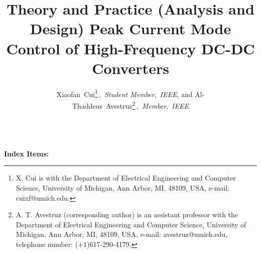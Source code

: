\documentclass[pdftex,letterpaper,11pt]{article}
\begin{document}
\theoremstyle{definition}
\newtheorem{theorem}{Theorem}

\theoremstyle{definition}
\newtheorem{definition}{Definition}

\theoremstyle{definition}
\newtheorem{corollary}{Corollary}

\title {\large  \bf \vspace{-10ex}
Theory and Practice (Analysis and Design) Peak Current Mode Control of High-Frequency DC-DC Converters
\vspace{0ex}}
\date{}
\author{Xiaofan~Cui\thanks{X. Cui is with the Department
of Electrical Engineering and Computer Science, University of Michigan, Ann Arbor,
MI, 48109, USA, e-mail: cuixf@umich.edu.}\,,\ \textit{Student Member},~\textit{IEEE},
        and Al-Thaddeus~Avestruz\thanks{A. T. Avestruz (corresponding author) is an assistant professor with the Department
        of Electrical Engineering and Computer Science, University of Michigan, Ann Arbor, MI, 48109, USA, e-mail: avestruz@umich.edu, telephone number: (+1)617-290-4179.}\,,\ \textit{Member},~\textit{IEEE}
}
\maketitle
\thispagestyle{empty}
\pagestyle{empty}

\renewcommand{\figurename}{Fig.}


\\
\textbf{Index Items:}
\newpage








{\vspace{\baselineskip}


}
\end{document}
